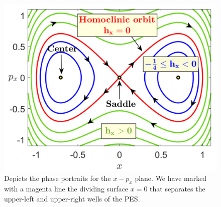 \documentclass[10pt,aps,onecolumn,superscriptaddress]{revtex4-2}
\begin{document}
	\begin{figure}[htbp]
		\begin{center}
		
			\includegraphics[scale=0.34]{phasePort_symm_1D_xDoF}
		\end{center}
		\caption{Depicts the phase portraits for the $x-p_x$  plane. We have marked with a magenta line the dividing surface $x = 0$ that separates the upper-left and upper-right wells of the PES.}
		\label{phasePort_1DoF_symm}
	\end{figure}


\end{document}
